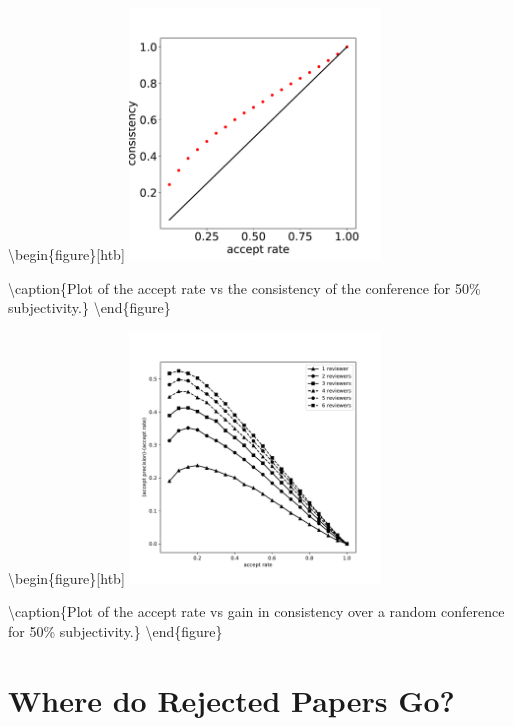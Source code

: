 \textbackslash begin\{figure\}{[}htb{]}
\includegraphics[width=0.50\textwidth]{diagrams/neurips/consistency-vs-accept-rate.pdf}

\textbackslash caption\{Plot of the accept rate vs the consistency of
the conference for 50\% subjectivity.\}
\label{consistency-vs-accept-rate} \textbackslash end\{figure\}

\textbackslash begin\{figure\}{[}htb{]}
\includegraphics[width=0.50\textwidth]{diagrams/neurips/gain-in-consistency.pdf}

\textbackslash caption\{Plot of the accept rate vs gain in consistency
over a random conference for 50\% subjectivity.\}
\label{gain-in-consistency} \textbackslash end\{figure\}

\hypertarget{where-do-rejected-papers-go}{%
\section{Where do Rejected Papers
Go?}\label{where-do-rejected-papers-go}}

\begin{flushright}
\end{flushright}

